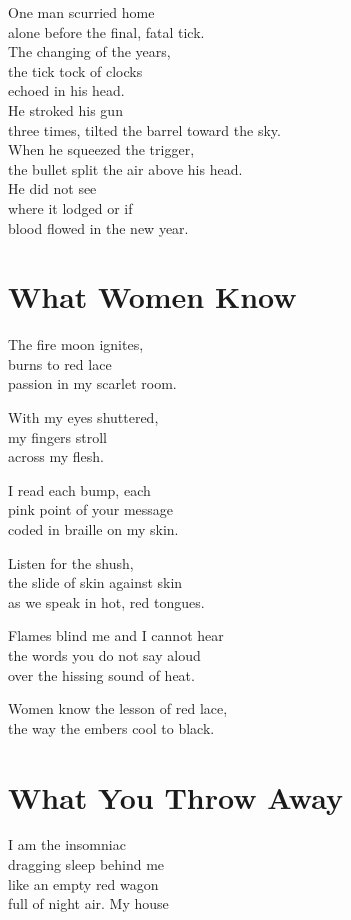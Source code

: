 \documentclass[twoside,10pt]{book}
\begin{document}
One man scurried home\\
alone before the final, fatal tick.\\
The changing of the years,\\
the tick tock of clocks\\
echoed in his head.\\
He stroked his gun\\
three times, tilted the barrel toward the sky.\\
When he squeezed the trigger,\\
the bullet split the air above his head.\\
He did not see\\
where it lodged or if\\
blood flowed in the new year.


\clearpage
\section{What Women Know}

The fire moon ignites,\\
burns to red lace\\
passion in my scarlet room.

With my eyes shuttered,\\
my fingers stroll\\
across my flesh.

I read each bump, each\\
pink point of your message\\
coded in braille on my skin.

Listen for the shush,\\
the slide of skin against skin\\
as we speak in hot, red tongues.

Flames blind me and I cannot hear\\
the words you do not say aloud\\
over the hissing sound of heat.

Women know the lesson of red lace,\\
the way the embers cool to black.


\clearpage
\section{What You Throw Away}

I am the insomniac\\
dragging sleep behind me\\
like an empty red wagon\\
full of night air. My house
\end{document}
